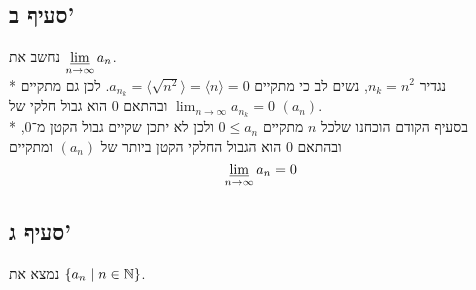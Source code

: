\subsection{סעיף ב'}
נחשב את $\displaystyle\operatorname*{\underline{lim}}_{n \to \infty} a_n$. \\*
נגדיר $n_k = n^2$, נשים לב כי מתקיים $a_{n_k} = \langle \sqrt{n^2} \rangle = \langle n \rangle = 0$.
לכן גם מתקיים $\lim_{n \to \infty} a_{n_k} = 0$ ובהתאם 0 הוא גבול חלקי של $(a_n)$. \\*
בסעיף הקודם הוכחנו שלכל $n$ מתקיים $0 \le a_n$ ולכן לא יתכן שקיים גבול הקטן מ־0, ובהתאם 0 הוא הגבול החלקי הקטן ביותר של $(a_n)$ ומתקיים
\[
	\operatorname*{\underline{lim}}_{n \to \infty} a_n = 0
\]

\subsection{סעיף ג'}
נמצא את $\{ a_n \mid n \in \mathbb{N} \}$.

